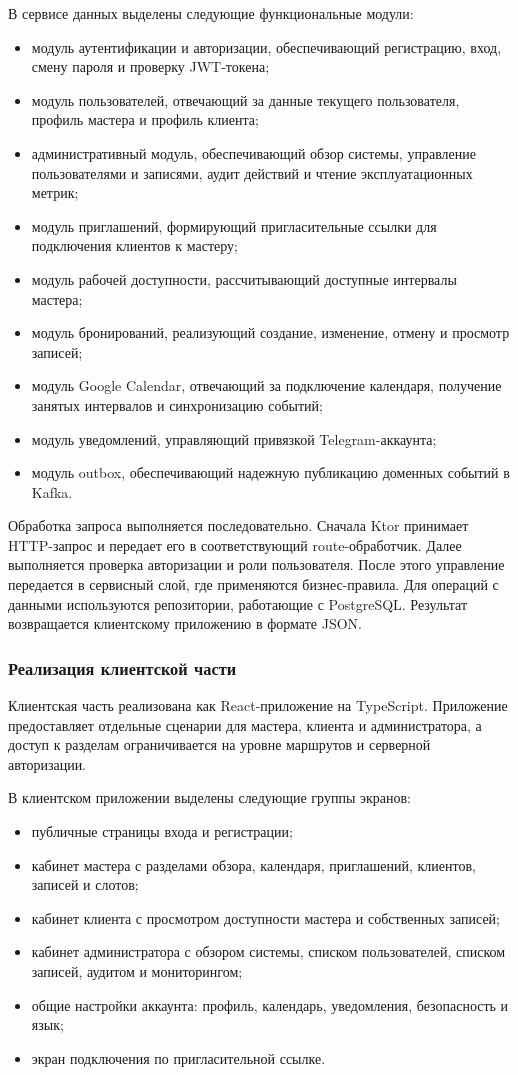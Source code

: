 В сервисе данных выделены следующие функциональные модули:
\begin{itemize}
\item модуль аутентификации и авторизации, обеспечивающий регистрацию, вход, смену пароля и проверку JWT-токена;
\item модуль пользователей, отвечающий за данные текущего пользователя, профиль мастера и профиль клиента;
\item административный модуль, обеспечивающий обзор системы, управление пользователями и записями, аудит действий и чтение эксплуатационных метрик;
\item модуль приглашений, формирующий пригласительные ссылки для подключения клиентов к мастеру;
\item модуль рабочей доступности, рассчитывающий доступные интервалы мастера;
\item модуль бронирований, реализующий создание, изменение, отмену и просмотр записей;
\item модуль Google Calendar, отвечающий за подключение календаря, получение занятых интервалов и синхронизацию событий;
\item модуль уведомлений, управляющий привязкой Telegram-аккаунта;
\item модуль outbox, обеспечивающий надежную публикацию доменных событий в Kafka.
\end{itemize}

Обработка запроса выполняется последовательно. Сначала Ktor принимает HTTP-запрос и передает его в соответствующий route-обработчик. Далее выполняется проверка авторизации и роли пользователя. После этого управление передается в сервисный слой, где применяются бизнес-правила. Для операций с данными используются репозитории, работающие с PostgreSQL. Результат возвращается клиентскому приложению в формате JSON.

\subsubsection{Реализация клиентской части}

Клиентская часть реализована как React-приложение на TypeScript. Приложение предоставляет отдельные сценарии для мастера, клиента и администратора, а доступ к разделам ограничивается на уровне маршрутов и серверной авторизации.

В клиентском приложении выделены следующие группы экранов:
\begin{itemize}
\item публичные страницы входа и регистрации;
\item кабинет мастера с разделами обзора, календаря, приглашений, клиентов, записей и слотов;
\item кабинет клиента с просмотром доступности мастера и собственных записей;
\item кабинет администратора с обзором системы, списком пользователей, списком записей, аудитом и мониторингом;
\item общие настройки аккаунта: профиль, календарь, уведомления, безопасность и язык;
\item экран подключения по пригласительной ссылке.
\end{itemize}

